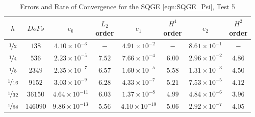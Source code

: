 \begin{table}%
\begin{center}
\begin{tabular}{|c|c|c|c|c|c|c|c|}%
  \hline
  $h$ & $DoFs$ & $e_0$ & $L_2$ order & $e_1$ & $H^1$ order & $e_2$ & $H^2$ order \\[0.2em] %
  \hline
  $\nicefrac{1}{2}$ & $138$ & $4.10\times 10^{-3}$ & $-$ & $4.91\times 10^{-2}$ & $-$ & $8.61\times 10^{-1}$ & $-$\\
  $\nicefrac{1}{4}$ & $536$ & $2.23\times 10^{-5}$ & $7.52$ & $7.66\times 10^{-4}$ & $6.00$ & $2.96\times 10^{-2}$ & $4.86$\\
  $\nicefrac{1}{8}$ & $2349$ & $2.35\times 10^{-7}$ & $6.57$ & $1.60\times 10^{-5}$ & $5.58$ & $1.31\times 10^{-3}$ & $4.50$\\
  $\nicefrac{1}{16}$ & $9152$ & $3.03\times 10^{-9}$ & $6.28$ & $4.33\times 10^{-7}$ & $5.21$ & $7.53\times 10^{-5}$ & $4.12$\\
  $\nicefrac{1}{32}$ & $36150$ & $4.64\times 10^{-11}$ & $6.03$ & $1.37\times 10^{-8}$ & $4.99$ & $4.84\times 10^{-6}$ & $3.96$\\
  $\nicefrac{1}{64}$ & $146090$ & $9.86\times 10^{-13}$ & $5.56$ & $4.10\times
  10^{-10}$ & $5.06$ & $2.92\times 10^{-7}$ & $4.05$ \\[0.2em]
 \hline
\end{tabular}
\end{center}
\caption{Errors and Rate of Convergence for the SQGE \eqref{eqn:SQGE_Psi}, Test 5}
\label{tab:SQGEsinErrors}
\end{table}

